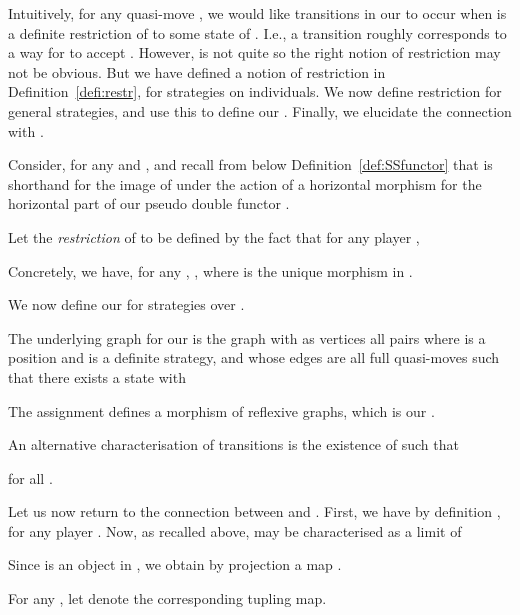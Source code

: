 \documentclass{LMCS}
\theoremstyle{plain}\newtheorem{satz}[thm]{Satz}
\begin{document}
Intuitively, for any quasi-move , we would like
transitions  in our \lts{} to occur when 
is a definite restriction of  to some state of
.  I.e., a transition roughly corresponds to a way for
 to accept .  However,  is not quite
 so the right notion of restriction may not be
obvious. But we have defined a notion of restriction in
Definition~\ref{defi:restr}, for strategies on individuals.  We now
define restriction for general strategies, and use this to define our
\lts{}. Finally, we elucidate the connection with .

Consider, for any  and , and recall from below
Definition~\ref{def:SSfunctor} that  is shorthand for the
image of  under the action of a horizontal morphism  for the horizontal part of our pseudo double functor
.

\begin{defi}
  Let the \emph{restriction}  of  to
   be defined by the fact that for any player , 
\end{defi}
Concretely, we have, for any , , where
 is the unique morphism  in .

We now define our \lts{} for strategies over .
\begin{defi}
  The underlying graph  for our \lts{} is the graph with as
  vertices all pairs  where  is a position and 
  is a definite strategy, and whose edges  are all
  full quasi-moves  such that there exists a
  state  with 

The assignment  defines a morphism  of reflexive graphs, which is our \lts{}.
\end{defi}
An alternative characterisation of transitions  is the existence of  such that

for all .

Let us now return to the connection between 
and .
First, we have
by definition ,
for any player .  
Now, as recalled above,  may be characterised as a
limit of
   
  Since  is an object in
  , we obtain by projection a map .

\begin{defi}
  For any , let  denote the
  corresponding tupling map.
\end{defi}
\end{document}
